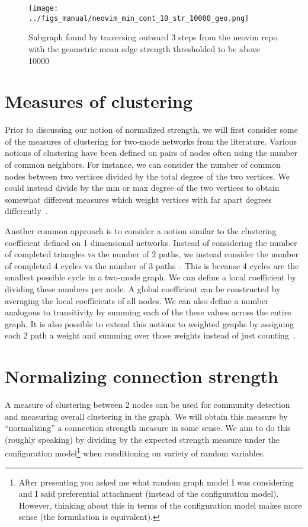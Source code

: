 \documentclass{pset}
\begin{document}
\begin{figure}[ht]
\centering
\texttt{[image: ../figs\_manual/neovim\_min\_cont\_10\_str\_10000\_geo.png]}
\caption{Subgraph found by traversing outward 3 steps from the neovim repo with
    the geometric mean edge strength thresholded to be above 10000}\label{fig:neovim geo}
\end{figure}

\section*{Measures of clustering}

Prior to discussing our notion of normalized strength,
we will first consider some of the measures of clustering for two-mode networks
from the literature.
Various notions of clustering have been defined on pairs of nodes
often using the number of common neighbors.
For instance, we can consider the number of common nodes between
two vertices divided by the total degree of the two vertices. We could instead
divide by
the min or max degree of the two vertices to obtain somewhat different
measures which weight vertices with far apart degrees differently~\cite{guillaume}.

Another common approach is to consider a notion similar to the clustering coefficient
defined on 1 dimensional networks. Instead of considering the number of completed
triangles vs the number of 2 paths, we instead consider the
number of completed 4 cycles vs the number of 3 paths~\cite{robins}.
This is because 4 cycles are the smallest possible cycle in a two-mode graph.
We can define a local coefficient by dividing these numbers per node.
A global coefficient can be constructed by averaging the local coefficients of
all nodes.
We can also define a number analogous to transitivity by summing each
of the these values across the entire graph.
It is also possible to extend this notions to weighted
graphs by assigning each 2 path a weight and summing over those weights instead
of just counting~\cite{opsahl}.

\section*{Normalizing connection strength}

A measure of clustering between 2 nodes can be used for community detection and
measuring overall clustering in the graph.   We will obtain this measure by
``normalizing'' a connection strength measure in some sense. We aim to do this
(roughly speaking) by dividing by the expected strength measure under
the configuration model\footnote{After presenting you asked me what random graph model I was considering and I said preferential attachment (instead of the configuration model). However, thinking about this in terms of the configuration model makes more sense (the formulation is equivalent).} when conditioning on variety of random variables.
\end{document}
